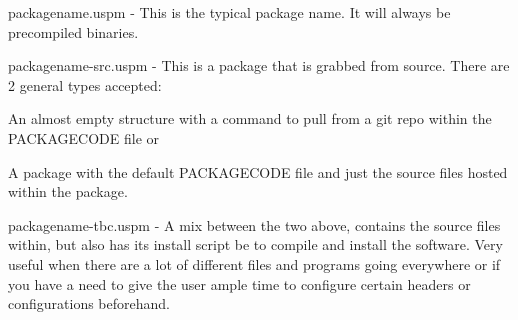 {\ttfamily packagename.\+uspm} -\/ This is the typical package name. It will always be precompiled binaries.

{\ttfamily packagename-\/src.\+uspm} -\/ This is a package that is grabbed from source. There are 2 general types accepted\+:
\begin{DoxyEnumerate}
\item An almost empty structure with a command to pull from a git repo within the {\ttfamily P\+A\+C\+K\+A\+G\+E\+C\+O\+DE} file or
\item A package with the default {\ttfamily P\+A\+C\+K\+A\+G\+E\+C\+O\+DE} file and just the source files hosted within the package.
\end{DoxyEnumerate}

{\ttfamily packagename-\/tbc.\+uspm} -\/ A mix between the two above, contains the source files within, but also has its install script be to compile and install the software. Very useful when there are a lot of different files and programs going everywhere or if you have a need to give the user ample time to configure certain headers or configurations beforehand. 